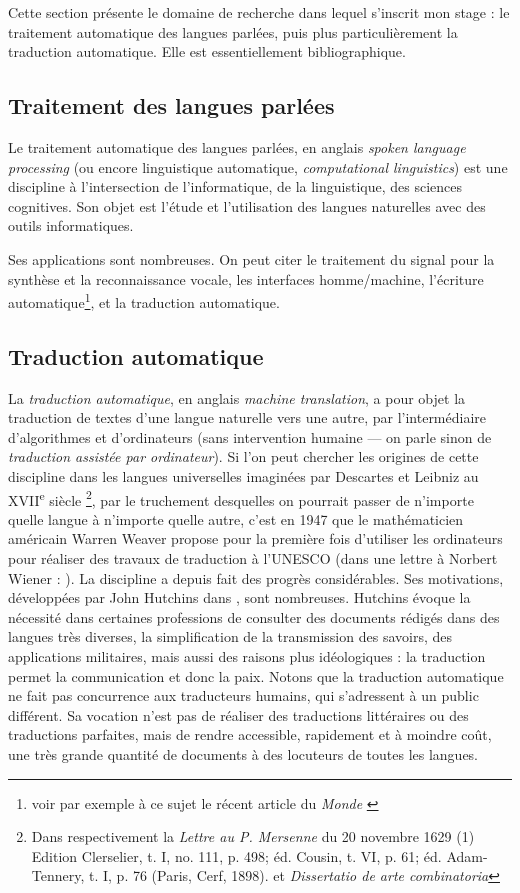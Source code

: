 \documentclass[a4paper,10pt]{article}
\begin{document}
Cette section présente le domaine de recherche dans lequel s'inscrit mon stage : le traitement automatique des langues parlées, puis plus particulièrement la traduction automatique. Elle est essentiellement bibliographique.

\subsection{Traitement des langues parlées}

Le traitement automatique des langues parlées, en anglais \emph{spoken language processing} (ou encore linguistique automatique, \emph{computational linguistics}) est une discipline à l'intersection de l'informatique, de la linguistique, des sciences cognitives. Son objet est l'étude et l'utilisation des langues naturelles avec des outils informatiques.

Ses applications sont nombreuses. On peut citer le traitement du signal pour la synthèse et la reconnaissance vocale, les interfaces homme/machine, l'écriture automatique\footnote{voir par exemple à ce sujet le récent article du \emph{Monde} \cite{algorithmesplume}}, et la traduction automatique.


\subsection{Traduction automatique}

La \emph{traduction automatique}, en anglais \emph{machine translation}, a pour objet la traduction de textes d'une langue naturelle vers une autre, par l'intermédiaire d'algorithmes et d'ordinateurs (sans intervention humaine --- on parle sinon de \emph{traduction assistée par ordinateur}). Si l'on peut chercher les origines de cette discipline dans les langues universelles imaginées par Descartes et Leibniz au XVII\textsuperscript{e} siècle
\footnote{Dans respectivement la \emph{Lettre au P. Mersenne} du 20 novembre 1629
(1) Edition Clerselier, t. I, no. 111, p. 498; éd. Cousin, t. VI, p. 61; éd. Adam-Tennery, t. I, p. 76 (Paris, Cerf, 1898).
et \emph{Dissertatio de arte combinatoria}}, par le truchement desquelles on pourrait passer de n'importe quelle langue à n'importe quelle autre, c'est en 1947 que le mathématicien américain Warren Weaver propose pour la première fois d'utiliser les ordinateurs pour réaliser des travaux de traduction à l'UNESCO (dans une lettre à Norbert Wiener : \cite{weaver1947letters}).
La discipline a depuis fait des progrès considérables. Ses motivations, développées par John Hutchins dans \cite{hutchins1986machine}, 
sont nombreuses. Hutchins évoque la nécessité dans certaines professions de consulter des documents rédigés dans des langues très diverses, la simplification de la transmission des savoirs, des applications militaires, mais aussi des raisons plus idéologiques : la traduction permet la communication et donc la paix. Notons que la traduction automatique ne fait pas concurrence aux traducteurs humains, qui s'adressent à un public différent. Sa vocation n'est pas de réaliser des traductions littéraires ou des traductions parfaites, mais de rendre accessible, rapidement et à moindre coût, une très grande quantité de documents à des locuteurs de toutes les langues.
\end{document}
